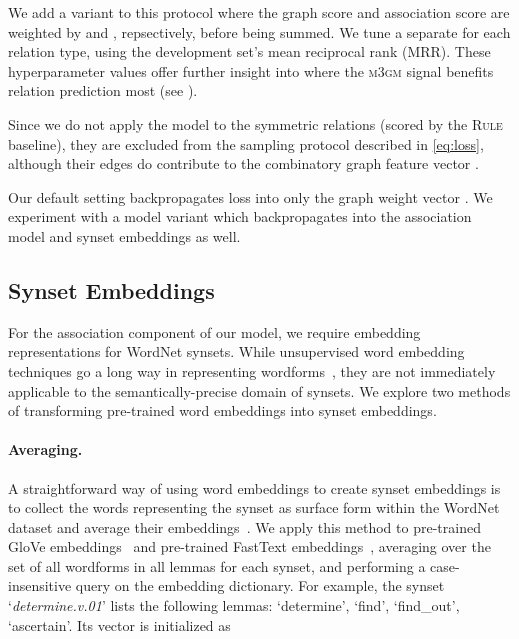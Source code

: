 \documentclass[11pt,twocolumn]{article}
\newcommand{\WN}[0]{WordNet}
\newcommand{\sysname}[0]{\textsc{m3gm}}
\begin{document}
We add a variant to this protocol where the graph score and association score are weighted by  and , repsectively, before being summed.
We tune a separate  for each relation type, using the development set's mean reciprocal rank (MRR).
These hyperparameter values offer further insight into where the \sysname{} signal benefits relation prediction most (see ).

Since we do not apply the model to the symmetric relations (scored by the \textsc{Rule} baseline), they are excluded from the sampling protocol described in \cref{eq:loss}, although their edges do contribute to the combinatory graph feature vector .

Our default setting backpropagates loss into only the graph weight vector .
We experiment with a model variant which backpropagates into the association model and synset embeddings as well.

\subsection{Synset Embeddings}
\label{ssec:embs}

For the association component of our model, we require embedding representations for \WN{} synsets.
While unsupervised word embedding techniques go a long way in representing wordforms~\cite{collobert2011natural,mikolov2013efficient,pennington2014glove}, they are not immediately applicable to the semantically-precise domain of synsets.
We explore two methods of transforming pre-trained word embeddings into synset embeddings.

\paragraph{Averaging.}
A straightforward way of using word embeddings to create synset embeddings is to collect the words representing the synset as surface form within the \WN{} dataset and average their embeddings~\cite{SocherChenManningNg2013}.
We apply this method to pre-trained GloVe embeddings~\cite{pennington2014glove} and pre-trained FastText embeddings~\cite{bojanowski2017enriching}, averaging over the set of all wordforms in all lemmas for each synset, and performing a case-insensitive query on the embedding dictionary.
For example, the synset `\textit{determine.v.01}' lists the following lemmas: `determine', `find', `find\_out', `ascertain'.
Its vector is initialized as 
\end{document}
